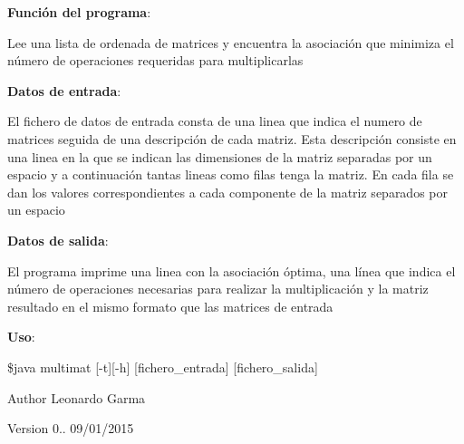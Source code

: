 {\bfseries \-Función del programa}\-: 

\-Lee una lista de ordenada de matrices y encuentra la asociación que minimiza el número de operaciones requeridas para multiplicarlas

{\bfseries \-Datos de entrada}\-: 

\-El fichero de datos de entrada consta de una linea que indica el numero de matrices seguida de una descripción de cada matriz. \-Esta descripción consiste en una linea en la que se indican las dimensiones de la matriz separadas por un espacio y a continuación tantas lineas como filas tenga la matriz. \-En cada fila se dan los valores correspondientes a cada componente de la matriz separados por un espacio

{\bfseries \-Datos de salida}\-: 

\-El programa imprime una linea con la asociación óptima, una línea que indica el número de operaciones necesarias para realizar la multiplicación y la matriz resultado en el mismo formato que las matrices de entrada

{\bfseries \-Uso}\-: 

\$java multimat \mbox{[}-\/t\mbox{]}\mbox{[}-\/h\mbox{]} \mbox{[}fichero\-\_\-entrada\mbox{]} \mbox{[}fichero\-\_\-salida\mbox{]} 

\begin{DoxyAuthor}{\-Author}
\-Leonardo \-Garma 
\end{DoxyAuthor}
\begin{DoxyVersion}{\-Version}
0.. 09/01/2015 
\end{DoxyVersion}
